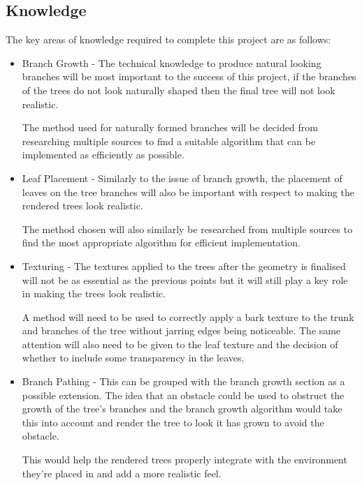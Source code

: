 \documentclass[review]{cmpreport}
\begin{document}
\subsection{Knowledge}
The key areas of knowledge required to complete this project are as follows:
\begin{itemize}
      \item Branch Growth - The technical knowledge to produce natural looking 
            branches will be most important to the success of this project, 
            if the branches of the trees do not look naturally shaped then 
            the final tree will not look realistic. \par
            The method used for naturally formed branches will be decided from 
            researching multiple sources to find a suitable algorithm that 
            can be implemented as efficiently as possible.
      \item Leaf Placement - Similarly to the issue of branch growth, the 
            placement of leaves on the tree branches will also be important 
            with respect to making the rendered trees look realistic. \par 
            The method chosen will also similarly be researched from multiple 
            sources to find the most appropriate algorithm for efficient 
            implementation.
      \item Texturing - The textures applied to the trees after the geometry 
            is finalised will not be as essential as the previous points but 
            it will still play a key role in making the trees look realistic.
            \par A method will need to be used to correctly apply a bark 
            texture to the trunk and branches of the tree without jarring 
            edges being noticeable. The same attention will also need to be 
            given to the leaf texture and the decision of whether to include 
            some transparency in the leaves.
      \item Branch Pathing - This can be grouped with the branch growth section 
            as a possible extension. The idea that an obstacle could be used 
            to obstruct the growth of the tree's branches and the branch growth 
            algorithm would take this into account and render the tree to look 
            it has grown to avoid the obstacle. \par 
            This would help the rendered trees properly integrate with the 
            environment they're placed in and add a more realistic feel.

\end{itemize}
\end{document}

